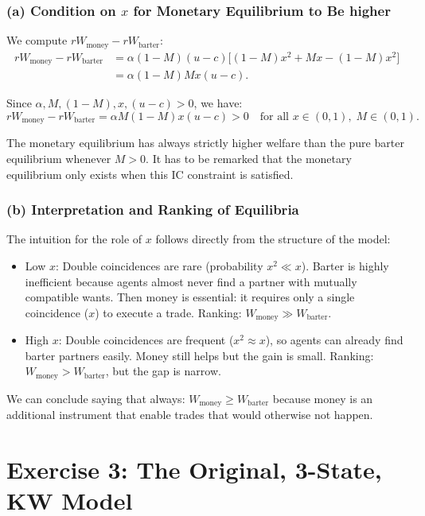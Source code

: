 \documentclass[11pt, a4paper]{article}
\begin{document}
\subsubsection*{(a) Condition on $x$ for Monetary Equilibrium to Be higher}

We compute $rW_{\text{money}} - rW_{\text{barter}}$:
\begin{align*}
  rW_{\text{money}} - rW_{\text{barter}}
  &= \alpha(1-M)(u-c)\bigl[(1-M)x^2 + Mx - (1-M)x^2\bigr] \\
  &= \alpha(1-M)Mx(u-c).
\end{align*}

Since $\alpha, M, (1-M), x, (u-c) > 0$, we have:
\[
  rW_{\text{money}} - rW_{\text{barter}} = \alpha M(1-M)x(u-c) > 0
  \quad \text{for all } x \in (0,1),\; M \in (0,1).
\]

The monetary equilibrium has always strictly higher welfare than the
pure barter equilibrium whenever $M > 0$. It has to be remarked that the monetary equilibrium only exists when this IC constraint is satisfied.

\subsubsection*{(b) Interpretation and Ranking of Equilibria}

The intuition for the role of $x$ follows directly from the structure of the model:

\begin{itemize}
  \item Low $x$: Double coincidences are rare (probability $x^2 \ll x$).
        Barter is highly inefficient because agents almost never find a partner with mutually compatible wants. Then money is essential: it requires only a single coincidence ($x$) to execute a trade.
        Ranking: $W_{\text{money}} \gg W_{\text{barter}}$.

  \item High $x$: Double coincidences are frequent ($x^2 \approx x$),
        so agents can already find barter partners easily. Money still helps but the gain is small.
        Ranking: $W_{\text{money}} > W_{\text{barter}}$, but the gap is narrow.

\end{itemize}
We can conclude saying that always: $W_{\text{money}} \geq W_{\text{barter}}$ because money is an additional instrument that enable trades that would otherwise not happen.
\section*{Exercise 3: The Original, 3-State, KW Model}
\end{document}
